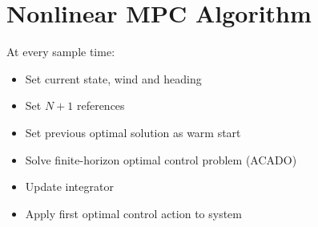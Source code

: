 \ETHslide
\section*{Nonlinear MPC Algorithm}
\vspace*{\fill}

At every sample time:
\begin{itemize}
\item[\ETHitem] Set current state, wind and heading
\item[\ETHitem] Set $N+1$ references
\item[\ETHitem] Set previous optimal solution as warm start
\item[\ETHitem] Solve finite-horizon optimal control problem (ACADO)
\item[\ETHitem] Update integrator
\item[\ETHitem] Apply first optimal control action to system
\end{itemize}

\vspace*{\fill}
\clearpage